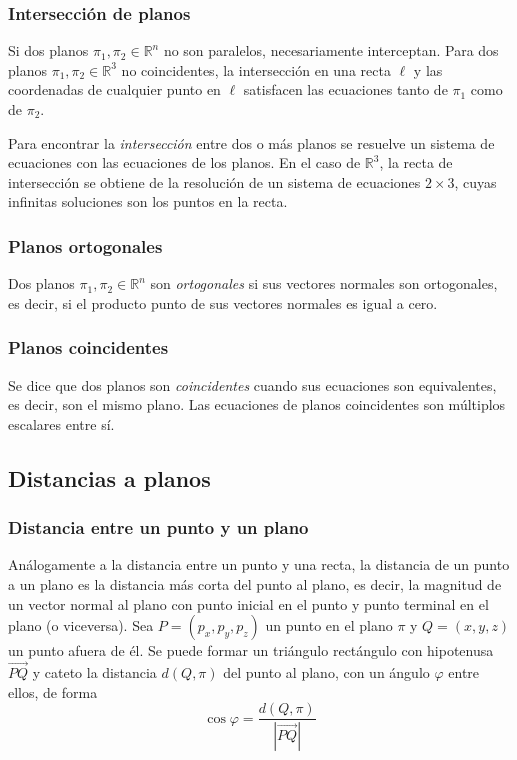 \documentclass{fmbnotes}
\begin{document}
\subsubsection{Intersección de planos}

Si dos planos \( \pi_{1}, \pi_{2} \in \mathbb{R}^{n} \) no son paralelos, necesariamente interceptan. Para dos planos \( \pi_{1}, \pi_{2} \in \mathbb{R}^{3} \) no coincidentes, la intersección en una recta \( \ell \) y las coordenadas de cualquier punto en \( \ell \) satisfacen las ecuaciones tanto de \( \pi_{1} \) como de \( \pi_{2} \).

Para encontrar la \emph{intersección} entre dos o más planos se resuelve un sistema de ecuaciones con las ecuaciones de los planos. En el caso de \( \mathbb{R}^{3} \), la recta de intersección se obtiene de la resolución de un sistema de ecuaciones \( 2 \times 3 \), cuyas infinitas soluciones son los puntos en la recta.

\subsubsection{ Planos ortogonales}

Dos planos \( \pi_{1}, \pi_{2} \in \mathbb{R}^{n} \) son \emph{ortogonales} si sus vectores normales son ortogonales, es decir, si el producto punto de sus vectores normales es igual a cero.

\subsubsection{ Planos coincidentes}

Se dice que dos planos son \emph{coincidentes} cuando sus ecuaciones son equivalentes, es decir, son el mismo plano. Las ecuaciones de planos coincidentes son múltiplos escalares entre sí.

\subsection{Distancias a planos}

\subsubsection{  Distancia entre un punto y un plano}

Análogamente a la distancia entre un punto y una recta, la distancia de un punto a un plano es la distancia más corta del punto al plano, es decir, la magnitud de un vector normal al plano con punto inicial en el punto y punto terminal en el plano (o viceversa). Sea \( P=\left(p_{x}, p_{y}, p_{z}\right) \) un punto en el plano \( \pi \) y \( Q=(x, y, z) \) un punto afuera de él. Se puede formar un triángulo rectángulo con hipotenusa \( \overrightarrow{P Q} \) y cateto la distancia \( d(Q, \pi) \) del punto al plano, con un ángulo \( \varphi \) entre ellos, de forma
\[ \cos \varphi =\frac{d(Q, \pi)}{\left|\overrightarrow{P Q}\right|} \]
\end{document}
